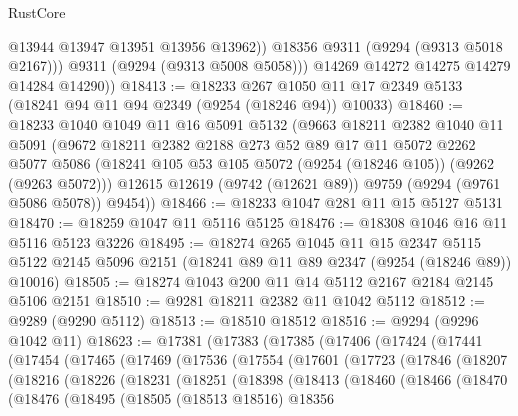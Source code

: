 \begin{lexlean}{RustCore}
\begin{coremodule}
                @13944
                @13947
                @13951
                @13956
                @13962))
            @18356
            @9311
            (@9294 (@9313 @5018 @2167)))
          @9311
          (@9294 (@9313 @5008 @5058)))
        @14269
        @14272
        @14275
        @14279
        @14284
        @14290))
@18413 := @18233
    @267
    @1050
    @11
    @17
    @2349
    @5133
    (@18241 @94 @11 @94 @2349 (@9254 (@18246 @94)) @10033)
@18460 := @18233
    @1040
    @1049
    @11
    @16
    @5091
    @5132
    (@9663
      @18211
      @2382
      @1040
      @11
      @5091
      (@9672
        @18211
        @2382
        @2188
        @273
        @52
        @89
        @17
        @11
        @5072
        @2262
        @5077
        @5086
        (@18241 @105 @53 @105 @5072 (@9254 (@18246 @105)) (@9262 (@9263 @5072)))
        @12615
        @12619
        (@9742 (@12621 @89))
        @9759
        (@9294 (@9761 @5086 @5078))
        @9454))
@18466 := @18233 @1047 @281 @11 @15 @5127 @5131
@18470 := @18259 @1047 @11 @5116 @5125
@18476 := @18308 @1046 @16 @11 @5116 @5123 @3226
@18495 := @18274
    @265
    @1045
    @11
    @15
    @2347
    @5115
    @5122
    @2145
    @5096
    @2151
    (@18241 @89 @11 @89 @2347 (@9254 (@18246 @89)) @10016)
@18505 := @18274 @1043 @200 @11 @14 @5112 @2167 @2184 @2145 @5106 @2151
@18510 := @9281 @18211 @2382 @11 @1042 @5112
@18512 := @9289 (@9290 @5112)
@18513 := @18510 @18512
@18516 := @9294 (@9296 @1042 @11)
@18623 := @17381
    (@17383
      (@17385
        (@17406
          (@17424
            (@17441
              (@17454
                (@17465
                  (@17469
                    (@17536
                      (@17554
                        (@17601
                          (@17723
                            (@17846
                              (@18207
                                (@18216
                                  (@18226
                                    (@18231
                                      (@18251
                                        (@18398
                                          (@18413
                                            (@18460
                                              (@18466
                                                (@18470
                                                  (@18476
                                                    (@18495
                                                      (@18505
                                                        (@18513 @18516)
                                                        @18356

\end{coremodule}
\end{lexlean}
